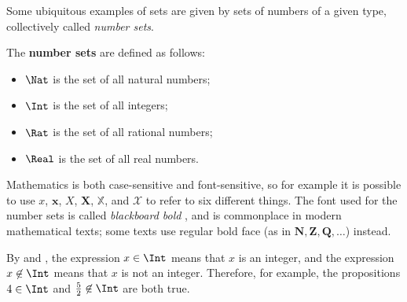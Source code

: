 Some ubiquitous examples of sets are given by sets of numbers of a given type, collectively called \textit{number sets}.

\begin{definition}
\label{defNumberSets}
The \textbf{number sets} are defined as follows:
\begin{itemize}
\item $\Nat$ is the set of all natural numbers;
\item $\Int$ is the set of all integers;
\item $\Rat$ is the set of all rational numbers;
\item $\Real$ is the set of all real numbers.
\end{itemize}
\end{definition}

\begin{aside}
Mathematics is both case-sensitive and font-sensitive, so for example it is possible to use $x$, $\mathbf{x}$, $X$, $\mathbf{X}$, $\mathbb{X}$, and $\mathcal{X}$ to refer to six different things. The font used for the number sets is called \textit{blackboard bold} , and is commonplace in modern mathematical texts; some texts use regular bold face (as in $\mathbf{N}, \mathbf{Z}, \mathbf{Q}, \dots$) instead.
\end{aside}

\begin{example}
By  and , the expression $x \in \Int$ means that $x$ is an integer, and the expression $x \not\in \Int$ means that $x$ is not an integer. Therefore, for example, the propositions $4 \in \Int$ and $\frac{5}{2} \not\in \Int$ are both true.
\end{example}


